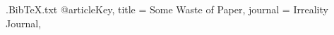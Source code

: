 \begin{filecontents*}{\jobname.BibTeX.txt}
@article{Key,
  title = {Some Waste of Paper},
  journal = {Irreality Journal},
}
\end{filecontents*}
\documentclass{article}
\usepackage{CoverPage}

\makeatletter Title: \CP@Title. Source: \CP@InSource\makeatother

